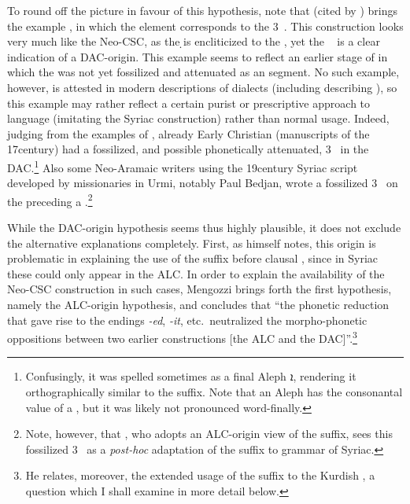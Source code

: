 To round off the picture in favour of this hypothesis, note that \citet[122]{Socin} (cited by \cite[230]{Tsetsereli}) brings the \Jil example , in which the  element corresponds to the 3\fem\ . This construction looks very much like the Neo-CSC, as the \d \lnk* is encliticized to the \prim, yet the \fem\  is a clear indication of a DAC-origin. This example seems to reflect an earlier stage of  in which the  was not yet fossilized and attenuated as an  segment.  No such example, however, is attested in modern descriptions of  dialects (including \cite{FoxJilu} describing \Jil), so this example may rather reflect a certain purist or prescriptive approach to language (imitating the Syriac construction) rather than normal usage. Indeed, judging from the examples of \citet[374f.]{MengozziExtended}, already Early Christian  (manuscripts of the 17\th century) had a fossilized, and possible phonetically attenuated, 3\masc\  in the DAC.\footnote{Confusingly, it was spelled sometimes as a final \Syr Aleph \textsyriac{ܐ}, rendering it orthographically similar to the  suffix. Note that an Aleph has the consonantal value of a  , but it was likely not  pronounced word-finally.} Also  some Neo-Aramaic writers using the 19\th century Syriac script developed by missionaries in Urmi, notably Paul Bedjan, wrote a fossilized 3\masc\  on the \prim preceding a  \d \citep[192, \S 6.2.6; 198, \S 6.3.6, fn.\ 33]{MurreUrmi}.\footnote{Note, however, that \citet[175]{MurreUrmi}, who adopts an ALC-origin view of the \ed suffix, sees this fossilized 3\masc\  as a \textit{post-hoc} adaptation of the \ed suffix to grammar of Syriac.}


While the DAC-origin hypothesis seems thus highly plausible, it does not exclude the alternative  explanations completely. First, as \citet[382]{MengozziExtended} himself notes, this origin is problematic in explaining the use of the \ed suffix before clausal \secns, since in Syriac these could only appear in the ALC. In order to explain the availability of the Neo-CSC construction in such cases, Mengozzi brings forth the first hypothesis, namely the ALC-origin hypothesis, and concludes that \enquote{the phonetic reduction that gave rise to the endings \textit{-ed}, \textit{-it}, etc.\ neutralized the morpho-phonetic oppositions between two earlier constructions [the ALC and the DAC]}.\footnote{He relates, moreover, the extended usage of the \ed suffix to the Kurdish \ez*, a question which I shall examine in more detail below.}

